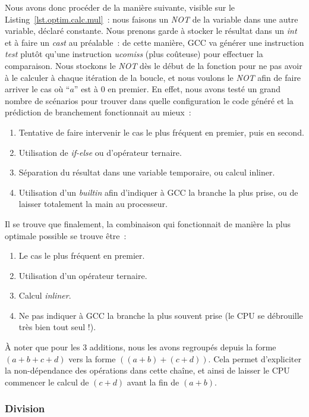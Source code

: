 \documentclass[12pt,a4paper]{article}
\begin{document}
Nous avons donc procéder de la manière suivante, visible sur le
Listing~\ref{lst.optim.calc.mul} : nous faisons un \textit{NOT} de la variable
dans une autre variable, déclaré constante. Nous prenons garde à stocker le
résultat dans un \textit{int} et à faire un \textit{cast} au préalable : de
cette manière, \ac{GCC} va générer une instruction \textit{test} plutôt qu'une
instruction \textit{ucomiss} (plus coûteuse) pour effectuer la comparaison. Nous
stockons le \textit{NOT} dès le début de la fonction pour ne pas avoir à le
calculer à chaque itération de la boucle, et nous voulons le \textit{NOT} afin
de faire arriver le cas où \enquote{$a$} est à 0 en premier. En effet, nous
avons testé un grand nombre de scénarios pour trouver dans quelle configuration
le code généré et la prédiction de branchement fonctionnait au mieux :
\begin{enumerate} \item Tentative de faire intervenir le cas le plus fréquent en
            premier, puis en second. \item Utilisation de \textit{if-else} ou
            d'opérateur ternaire. \item Séparation du résultat dans une variable
            temporaire, ou calcul inliner. \item Utilisation d'un
                \textit{builtin} afin d'indiquer à \ac{GCC} la branche la plus
prise, ou de laisser totalement la main au processeur. \end{enumerate} Il se
trouve que finalement, la combinaison qui fonctionnait de manière la plus
optimale possible se trouve être : \begin{enumerate} \item Le cas le plus
        fréquent en premier. \item Utilisation d'un opérateur ternaire. \item
        Calcul \textit{inliner}. \item Ne pas indiquer à \ac{GCC} la branche la
            plus souvent prise (le \acs{CPU} se débrouille très bien tout seul
!). \end{enumerate}

À noter que pour les 3 additions, nous les avons regroupés depuis la forme $(a +
b + c + d)$ vers la forme $((a + b) + (c + d))$. Cela permet d'expliciter la
non-dépendance des opérations dans cette chaîne, et ainsi de laisser le
\acs{CPU} commencer le calcul de $(c + d)$ avant la fin de $(a + b)$.

\subsubsection{Division}
\label{sub.optim.calc.div}
\end{document}
